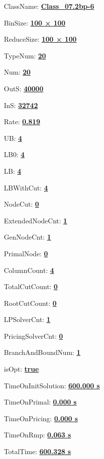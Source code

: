 \documentclass[11pt]{article}
\begin{document}
\pagestyle{empty}


ClassName: \underline{\textbf{Class_07.2bp-6}}
\par
BinSize: \underline{\textbf{100 × 100}}
\par
ReduceSize: \underline{\textbf{100 × 100}}
\par
TypeNum: \underline{\textbf{20}}
\par
Num: \underline{\textbf{20}}
\par
OutS: \underline{\textbf{40000}}
\par
InS: \underline{\textbf{32742}}
\par
Rate: \underline{\textbf{0.819}}
\par
UB: \underline{\textbf{4}}
\par
LB0: \underline{\textbf{4}}
\par
LB: \underline{\textbf{4}}
\par
LBWithCut: \underline{\textbf{4}}
\par
NodeCut: \underline{\textbf{0}}
\par
ExtendedNodeCnt: \underline{\textbf{1}}
\par
GenNodeCnt: \underline{\textbf{1}}
\par
PrimalNode: \underline{\textbf{0}}
\par
ColumnCount: \underline{\textbf{4}}
\par
TotalCutCount: \underline{\textbf{0}}
\par
RootCutCount: \underline{\textbf{0}}
\par
LPSolverCnt: \underline{\textbf{1}}
\par
PricingSolverCnt: \underline{\textbf{0}}
\par
BranchAndBoundNum: \underline{\textbf{1}}
\par
isOpt: \underline{\textbf{true}}
\par
TimeOnInitSolution: \underline{\textbf{600.000 s}}
\par
TimeOnPrimal: \underline{\textbf{0.000 s}}
\par
TimeOnPricing: \underline{\textbf{0.000 s}}
\par
TimeOnRmp: \underline{\textbf{0.063 s}}
\par
TotalTime: \underline{\textbf{600.328 s}}
\par
\newpage


\end{document}
